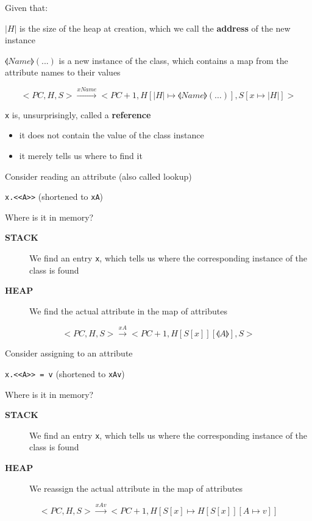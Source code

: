 \documentclass{beamer}
\begin{document}
\begin{slide}{
\item Given that:
\item $|H|$ is the size of the heap at creation, which we call the \textbf{address} of the new instance
\item $\llangle Name \rrangle(...)$ is a new instance of the class, which contains a map from the attribute names to their values

\fontsize{8pt}{7.2}\selectfont
$$<PC,H,S> \overset{xName}{\rightarrow} <PC+1,H[|H| \mapsto \llangle Name \rrangle(\dots)],S[x \mapsto |H|]>$$

\item \texttt{x} is, unsurprisingly, called a \textbf{reference}
\begin{itemize}
\item it does not contain the value of the class instance
\item it merely tells us where to find it
\end{itemize}
}\end{slide}

\begin{slide}{
\item Consider reading an attribute (also called lookup)
\item \texttt{x.<<A>>} (shortened to \texttt{xA})
\item Where is it in memory?
\begin{description}
\item[\textbf{STACK}] We find an entry \texttt{x}, which tells us where the corresponding instance of the class is found 
\item[\textbf{HEAP}] We find the actual attribute in the map of attributes
\end{description}

$$<PC,H,S> \overset{xA}{\rightarrow} <PC+1,H[S[x]][\llangle A \rrangle],S>$$
}\end{slide}



\begin{slide}{
\item Consider assigning to an attribute
\item \texttt{x.<<A>> = v} (shortened to \texttt{xAv})
\item Where is it in memory?
\begin{description}
\item[\textbf{STACK}] We find an entry \texttt{x}, which tells us where the corresponding instance of the class is found 
\item[\textbf{HEAP}] We reassign the actual attribute in the map of attributes
\end{description}

$$<PC,H,S> \overset{xAv}{\rightarrow} <PC+1,H[S[x] \mapsto H[S[x]][A \mapsto v]]$$
}\end{slide}
\end{document}
